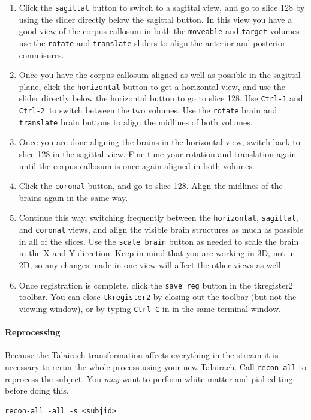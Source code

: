 \documentclass[paper=a4, fontsize=11pt]{scrartcl} %
\numberwithin{equation}{section} %
\numberwithin{figure}{section} %
\numberwithin{table}{section} %
\begin{document}
\begin{enumerate}
\item Click the \texttt{sagittal} button to switch to a sagittal view, and go to slice 128 by using the slider directly below the sagittal button. In this view you have a good view of the corpus callosum in both the \texttt{moveable} and \texttt{target} volumes use the \texttt{rotate} and \texttt{translate} sliders to align the anterior and posterior commisures.
\item Once you have the corpus callosum aligned as well as possible in the sagittal plane, click the \texttt{horizontal} button to get a horizontal view, and use the slider directly below the horizontal button to go to slice 128. Use \texttt{Ctrl-1} and \texttt{Ctrl-2 }to switch between the two volumes. Use the \texttt{rotate} brain and \texttt{translate} brain buttons to align the midlines of both volumes.
\item Once you are done aligning the brains in the horizontal view, switch back to slice 128 in the sagittal view. Fine tune your rotation and translation again until the corpus callosum is once again aligned in both volumes.
\item Click the \texttt{coronal} button, and go to slice 128. Align the midlines of the brains again in the same way.
\item Continue this way, switching frequently between the \texttt{horizontal}, \texttt{sagittal}, and \texttt{coronal} views, and align the visible brain structures as much as possible in all of the slices. Use the \texttt{scale brain} button as needed to scale the brain in the X and Y direction. Keep in mind that you are working in 3D, not in 2D, so any changes made in one view will affect the other views as well. 
\item Once registration is complete, click the \texttt{save reg} button in the tkregister2 toolbar. You can close \texttt{tkregister2} by closing out the toolbar (but not the viewing window), or by typing \texttt{Ctrl-C} in in the same terminal window.
\end{enumerate}

\paragraph{Reprocessing} Because the Talairach transformation affects everything in the stream it is necessary to rerun the whole process using your new Talairach.  Call \texttt{recon-all} to reprocess the subject.  You \textit{may} want to perform white matter and pial editing before doing this.
~\\
\begin{lstlisting}[frame=single]
recon-all -all -s <subjid>
\end{lstlisting}
\end{document}
